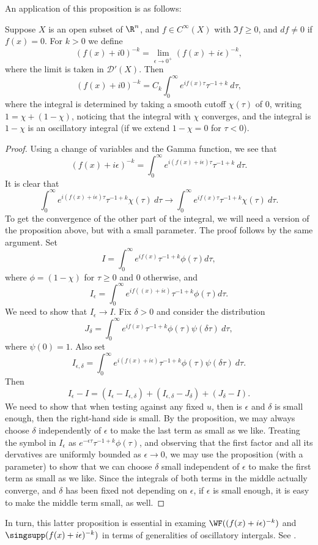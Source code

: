 \documentclass[12pt]{article}
\begin{document}
An application of this proposition is as follows:
\begin{prop}Suppose $X$ is an open subset of $\R^n$, and $f \in C^\infty(X)$ with $\Im f \geq 0$, and $df \neq 0$ if $f(x) = 0$. For $k > 0$ we define
\[(f(x)+i0)^{-k} = \lim_{\epsilon \to 0^+} (f(x)+i\epsilon)^{-k},\] where the limit is taken in $\mathcal D'(X)$. Then
\[(f(x)+i0)^{-k} = C_k\int_0^\infty e^{if(x)\tau}\tau^{-1+k}\ d\tau,\] where the integral is determined by taking a smooth cutoff $\chi(\tau)$ of $0$, writing $1 = \chi + (1-\chi)$, noticing that the integral with $\chi$ converges, and the integral is $1-\chi$ is an oscillatory integral (if we extend $1-\chi = 0$ for $\tau < 0$).\end{prop}
\begin{proof}Using a change of variables and the Gamma function, we see that
\[(f(x)+i\epsilon)^{-k} = \int_0^\infty e^{i(f(x)+i\epsilon)\tau}\tau^{-1+k}\ d\tau.\] It is clear that
\[\int_0^\infty e^{i(f(x)+i\epsilon)\tau}\tau^{-1+k}\chi(\tau)\ d\tau \to \int_0^\infty e^{if(x)\tau}\tau^{-1+k}\chi(\tau)\ d\tau.\] To get the convergence of the other part of the integral, we will need a version of the proposition above, but with a small parameter. The proof follows by the same argument. Set
\[I =  \int_{0}^\infty e^{if(x)}\tau^{-1+k}\phi(\tau) d\tau,\]
where $\phi = (1-\chi)$ for $\tau \geq 0$ and $0$ otherwise, and
\[I_\epsilon = \int_{0}^\infty e^{if((x)+i\epsilon)}\tau^{-1+k}\phi(\tau) d\tau.\] We need to show that $I_\epsilon \to I$.
Fix $\delta > 0$ and consider the distribution
\[J_\delta = \int_{0}^\infty e^{if(x)}\tau^{-1+k}\phi(\tau)\psi(\delta \tau)\ d\tau,\]
where $\psi(0) = 1$. Also set
\[I_{\epsilon,\delta} = \int_{0}^\infty e^{i(f(x)+i\epsilon)}\tau^{-1+k}\phi(\tau)\psi(\delta \tau)\ d\tau.\]
Then \[I_\epsilon - I = (I_\epsilon - I_{\epsilon,\delta}) + (I_{\epsilon,\delta}-J_{\delta}) + (J_{\delta} - I).\]
We need to show that when testing against any fixed $u$, then is $\epsilon$ and $\delta$ is small enough, then the right-hand side is small. By the proposition, we may always choose $\delta$ independently of $\epsilon$ to make the last term as small as we like. Treating the symbol in $I_\epsilon$ as $e^{-\epsilon\tau}\tau^{-1+k}\phi(\tau)$, and observing that the first factor and all its dervatives are uniformly bounded as $\epsilon \to 0$, we may use the proposition (with a parameter) to show that we can choose $\delta$ small independent of $\epsilon$ to make the first term as small as we like. Since the integrals of both terms in the middle actually converge, and $\delta$ has been fixed not depending on $\epsilon$, if $\epsilon$ is small enough, it is easy to make the middle term small, as well.\end{proof}
In turn, this latter proposition is essential in examing $\WF((f(x)+i\epsilon)^{-k})$ and $\singsupp (f(x)+i\epsilon)^{-k})$ in terms of generalities of oscillatory intergals. See \cite[Exercise~7.6]{GS}.
\end{document}
